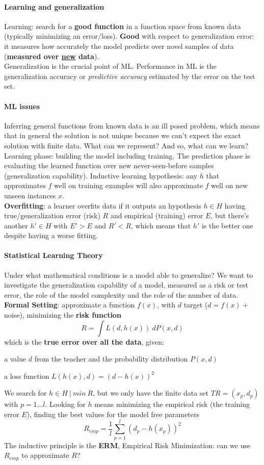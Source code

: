 \documentclass[10pt]{report}
\begin{document}
\paragraph{Learning and generalization} Learning: search for a \textbf{good function} in a function space from known data (typically minimizing an error/loss). \textbf{Good} with respect to generalization error: it measures how accurately the model predicts over novel samples of data (\textbf{measured over \underline{new} data}).\\
Generalization is the crucial point of ML. Performance in ML is the generalization accuracy or \textit{predictive accuracy} estimated by the error on the test set.
\paragraph{ML issues} Inferring general functions from known data is an ill posed problem, which means that in general the solution is not unique because we can't expect the exact solution with finite data. What can we represent? And so, what can we learn?\\
Learning phase: building the model including training. The prediction phase is evaluating the learned function over new never-seen-before samples (generalization capability). Inductive learning hypothesis: any $h$ that approximates $f$ well on training examples will also approximate $f$ well on new unseen instances $x$.\\
\textbf{Overfitting}: a learner overfits data if it outputs an hypothesis $h\in H$ having true/generalization error (risk) $R$ and empirical (training) error $E$, but there's another $h'\in H$ with $E' > E$ and $R' < R$, which means that $h'$ is the better one despite having a worse fitting.
\paragraph{Statistical Learning Theory} Under what mathematical conditions is a model able to generalize? We want to investigate the generalization capability of a model, measured as a risk or test error, the role of the model complexity and the role of the number of data.\\
\textbf{Formal Setting}: approximate a function $f(x)$, with $d$ target ($d = f(x) +$ noise), minimizing the \textbf{risk function} $$R = \int L(d, h(x))\:dP(x,d)$$ which is the \textbf{true error over all the data}, given:
\begin{list}{}{}
	\item a value $d$ from the teacher and the probability distribution $P(x,d)$
	\item a loss function $L(h(x),d) = (d - h(x))^2$
\end{list}
We search for $h\in H\:|\: min\:R$, but we only have the finite data set $TR = (x_p, d_p)$ with $p = 1\ldots l$. Looking for $h$ means minimizing the empirical risk (the training error $E$), finding the best values for the model free parameters $$R_{emp} = \frac{1}{l}\sum_{p=1}^l (d_p - h(x_p))^2$$
The inductive principle is the \textbf{ERM}, Empirical Risk Minimization: can we use $R_{emp}$ to approximate $R$?
\end{document}
